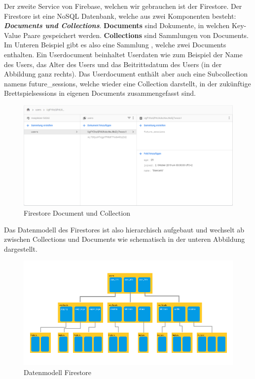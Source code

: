 Der zweite Service von Firebase, welchen wir gebrauchen ist der Firestore. Der Firestore ist eine NoSQL Datenbank, welche aus zwei Komponenten besteht: \textbf{\textit{Documents und Collections}}. \textbf{Documents} sind Dokumente, in welchen Key-Value Paare gespeichert werden. \textbf{Collections} sind Sammlungen von Documents. Im Unteren Beispiel gibt es also eine Sammlung , welche zwei Documents enthalten. Ein Userdocument beinhaltet Userdaten wie zum Beispiel der Name des Users, das Alter des Users und das Beitrittsdatum des Users (in der Abbildung ganz rechts). Das Userdocument enthält aber auch eine Subcollection namens future\_sessions, welche wieder eine Collection darstellt, in der zukünftige Brettspielsessions in eigenen Documents zusammengefasst sind. 

\begin{figure}[h]
    \centering
    \includegraphics[width=\textwidth]{images/firestore_document.PNG}
    \caption{Firestore Document und Collection}
    \label{fig:document_collection}
\end{figure}

Das Datenmodell des Firestores ist also hierarchisch aufgebaut und wechselt ab zwischen Collections und Documents wie schematisch in der unteren Abbildung dargestellt.

\begin{figure}[h]
    \centering
    \includegraphics[width=\textwidth]{images/firestore.png}
    \caption{Datenmodell Firestore}
    \label{fig:firestore}
\end{figure}


